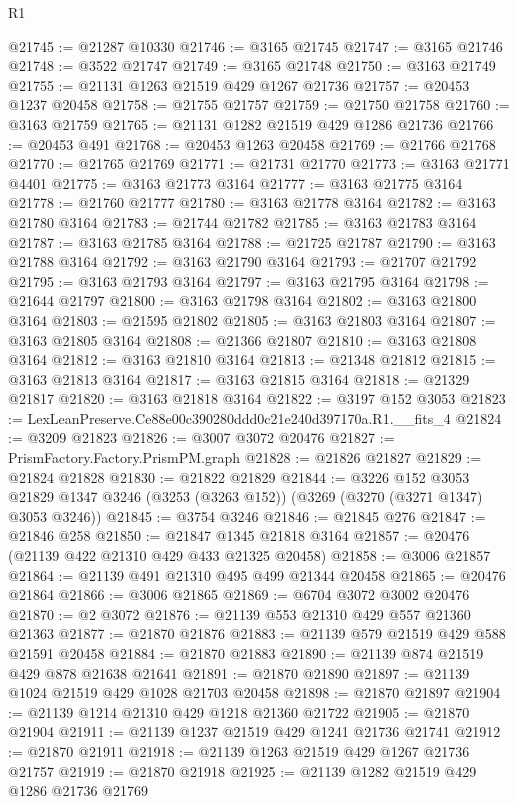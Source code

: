 \begin{lexlean}{R1}
\begin{coremodule}
@21745 := @21287 @10330
@21746 := @3165 @21745
@21747 := @3165 @21746
@21748 := @3522 @21747
@21749 := @3165 @21748
@21750 := @3163 @21749
@21755 := @21131 @1263 @21519 @429 @1267 @21736
@21757 := @20453 @1237 @20458
@21758 := @21755 @21757
@21759 := @21750 @21758
@21760 := @3163 @21759
@21765 := @21131 @1282 @21519 @429 @1286 @21736
@21766 := @20453 @491
@21768 := @20453 @1263 @20458
@21769 := @21766 @21768
@21770 := @21765 @21769
@21771 := @21731 @21770
@21773 := @3163 @21771 @4401
@21775 := @3163 @21773 @3164
@21777 := @3163 @21775 @3164
@21778 := @21760 @21777
@21780 := @3163 @21778 @3164
@21782 := @3163 @21780 @3164
@21783 := @21744 @21782
@21785 := @3163 @21783 @3164
@21787 := @3163 @21785 @3164
@21788 := @21725 @21787
@21790 := @3163 @21788 @3164
@21792 := @3163 @21790 @3164
@21793 := @21707 @21792
@21795 := @3163 @21793 @3164
@21797 := @3163 @21795 @3164
@21798 := @21644 @21797
@21800 := @3163 @21798 @3164
@21802 := @3163 @21800 @3164
@21803 := @21595 @21802
@21805 := @3163 @21803 @3164
@21807 := @3163 @21805 @3164
@21808 := @21366 @21807
@21810 := @3163 @21808 @3164
@21812 := @3163 @21810 @3164
@21813 := @21348 @21812
@21815 := @3163 @21813 @3164
@21817 := @3163 @21815 @3164
@21818 := @21329 @21817
@21820 := @3163 @21818 @3164
@21822 := @3197 @152 @3053
@21823 := LexLeanPreserve.Ce88e00c390280ddd0c21e240d397170a.R1.__fits_4
@21824 := @3209 @21823
@21826 := @3007 @3072 @20476
@21827 := PrismFactory.Factory.PrismPM.graph
@21828 := @21826 @21827
@21829 := @21824 @21828
@21830 := @21822 @21829
@21844 := @3226
    @152
    @3053
    @21829
    @1347
    @3246
    (@3253 (@3263 @152))
    (@3269 (@3270 (@3271 @1347) @3053 @3246))
@21845 := @3754 @3246
@21846 := @21845 @276
@21847 := @21846 @258
@21850 := @21847 @1345 @21818 @3164
@21857 := @20476 (@21139 @422 @21310 @429 @433 @21325 @20458)
@21858 := @3006 @21857
@21864 := @21139 @491 @21310 @495 @499 @21344 @20458
@21865 := @20476 @21864
@21866 := @3006 @21865
@21869 := @6704 @3072 @3002 @20476
@21870 := @2 @3072
@21876 := @21139 @553 @21310 @429 @557 @21360 @21363
@21877 := @21870 @21876
@21883 := @21139 @579 @21519 @429 @588 @21591 @20458
@21884 := @21870 @21883
@21890 := @21139 @874 @21519 @429 @878 @21638 @21641
@21891 := @21870 @21890
@21897 := @21139 @1024 @21519 @429 @1028 @21703 @20458
@21898 := @21870 @21897
@21904 := @21139 @1214 @21310 @429 @1218 @21360 @21722
@21905 := @21870 @21904
@21911 := @21139 @1237 @21519 @429 @1241 @21736 @21741
@21912 := @21870 @21911
@21918 := @21139 @1263 @21519 @429 @1267 @21736 @21757
@21919 := @21870 @21918
@21925 := @21139 @1282 @21519 @429 @1286 @21736 @21769

\end{coremodule}
\end{lexlean}
